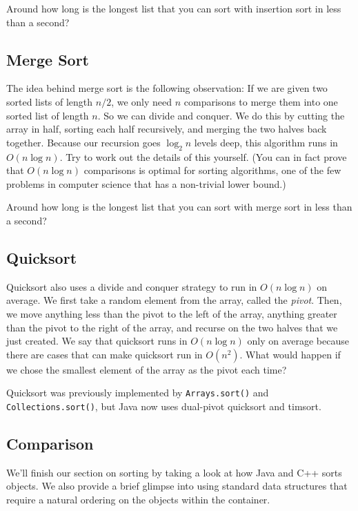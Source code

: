 Around how long is the longest list that you can sort with insertion sort in less than a second?

\subsection{Merge Sort}

The idea behind merge sort is the following observation: If we are given two sorted lists of length $n/2$, we only need $n$ comparisons to merge them into one sorted list of length $n$. So we can divide and conquer. We do this by cutting the array in half, sorting each half recursively, and merging the two halves back together. Because our recursion goes $\log_2 n$ levels deep, this algorithm runs in $O(n \log n)$. Try to work out the details of this yourself. (You can in fact prove that $O(n \log n)$ comparisons is optimal for sorting algorithms, one of the few problems in computer science that has a non-trivial lower bound.)

Around how long is the longest list that you can sort with merge sort in less than a second?

\subsection{Quicksort}

Quicksort also uses a divide and conquer strategy to run in $O(n \log n)$ on average. We first take a random element from the array, called the \emph{pivot}. Then, we move anything less than the pivot to the left of the array, anything greater than the pivot to the right of the array, and recurse on the two halves that we just created. We say that quicksort runs in $O(n \log n)$ only on average because there are cases that can make quicksort run in $O(n^2)$. What would happen if we chose the smallest element of the array as the pivot each time?

Quicksort was previously implemented by \texttt{Arrays.sort()} and \texttt{Collections.sort()}, but Java now uses dual-pivot quicksort and timsort.

\subsection{Comparison}

We'll finish our section on sorting by taking a look at how Java and C++ sorts objects. We also provide a brief glimpse into using standard data structures that require a natural ordering on the objects within the container.

